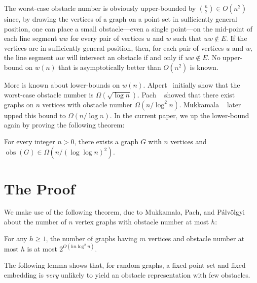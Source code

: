 \documentclass{patmorin}
\DeclareMathOperator{\obs}{obs}
\begin{document}
The worst-case obstacle number is obviously upper-bounded by
$\binom{n}{2}\in O(n^2)$ since, by drawing the vertices of a graph
 on a point set in sufficiently general position, one can place
a small obstacle---even a single point---on the mid-point of each
line segment $uw$ for every pair of vertices $u$ and $w$ such that
$uw\not\in E$.  If the vertices are in sufficiently general position,
then, for each pair of vertices $u$ and $w$, the line segment $uw$ will
intersect an obstacle if and only if $uw\not\in E$. No upper-bound on
$w(n)$ that is asymptotically better than $O(n^2)$ is known.

More is known about lower-bounds on $w(n)$.  Alpert \etal\
initially show that the worst-case obstacle number is
$\Omega(\sqrt{\log n})$.
Pach \etal\ \cite{mukkamala.pach.ea:graphs} showed that there exist
graphs on $n$ vertices with obstacle number $\Omega(n/\log^2 n)$.
Mukkamala \etal\ \cite{mukkamala.pach.ea:lower} later upped this bound
to $\Omega(n/\log n)$.  In the current paper, we up the lower-bound
again by proving the following theorem:
\begin{thm}
  For every integer $n>0$, there exists a graph $G$ with $n$ vertices
  and $\obs(G)\in\Omega(n/(\log\log n)^2)$.
\end{thm}

\section{The Proof}

We make use of the following theorem, due to Mukkamala, Pach, and
P\'alv\"olgyi \cite{mukkamala.pach.ea:lower} about the number of $n$
vertex graphs with obstacle number at most $h$:
\begin{thm}[Mukkamala, Pach, and P\'alv\"olgyi 2012]
  For any $h\ge 1$, the number of graphs having $m$ vertices and
  obstacle number at most $h$ is at most $2^{O(hn\log^2 n)}$.
\end{thm}

The following lemma shows that, for random graphs, a fixed point
set and fixed embedding is \emph{very} unlikely to yield an obstacle
representation with few obstacles.
\end{document}
